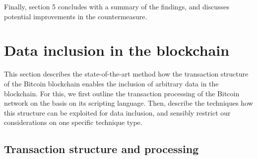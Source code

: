 \documentclass[a4paper,11pt,titlepage]{scrbook}
\begin{document}
Finally, section 5 concludes with a summary of the findings, and discusses potential improvements in the countermeasure.









\chapter{Data inclusion in the blockchain}

This section describes the state-of-the-art method how the transaction structure of the Bitcoin blockchain enables the inclusion of arbitrary data in the blockchain.
For this, we first outline the transaction processing of the Bitcoin network on the basis on its scripting language. Then, describe the techniques how this structure can be exploited for data inclusion, and sensibly restrict our considerations on one specific technique type.


\section{Transaction structure and processing}

\end{document}

